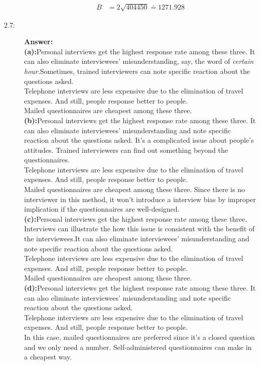 \documentclass{article}
\begin{document}
\begin{description}
\begin{align}
      B&=2\sqrt{404450}\doteq 1271.928
    \end{align}
    \item[2.7:]{\bf Answer:}\\
    {\bf (a):}Personal interviews get the highest response rate among these three. It can also eliminate interviewees' misunderstanding, say, the word of {\it certain hour}.Sometimes, trained interviewers can note specific reaction about the questions asked.\\
    Telephone interviews are less expensive due to the elimination of travel expenses. And still, people response better to people.\\
    Mailed questionnaires are cheapest among these three.\\
    {\bf (b):}Personal interviews get the highest response rate among these three. It can also eliminate interviewees' misunderstanding and note specific reaction about the questions asked. It's a complicated issue about people's attitudes. Trained interviewers can find out something beyond the questionnaires.\\
    Telephone interviews are less expensive due to the elimination of travel expenses. And still, people response better to people.\\
    Mailed questionnaires are cheapest among these three. Since there is no interviewer in this method, it won't introduce a interview bias by improper implication if the questionnaires are well-designed.\\
    {\bf (c):}Personal interviews get the highest response rate among these three. Interviews can illustrate the how this issue is consistent with the benefit of the interviewees.It can also eliminate interviewees' misunderstanding and note specific reaction about the questions asked.\\
    Telephone interviews are less expensive due to the elimination of travel expenses. And still, people response better to people.\\
    Mailed questionnaires are cheapest among these three.\\
    {\bf (d):}Personal interviews get the highest response rate among these three. It can also eliminate interviewees' misunderstanding and note specific reaction about the questions asked.\\
    Telephone interviews are less expensive due to the elimination of travel expenses. And still, people response better to people.\\
    In this case, mailed questionnaires are preferred since it's a closed question and we only need a number. Self-administered questionnaires can make in a cheapest way.\\

\end{description}
\end{document}
